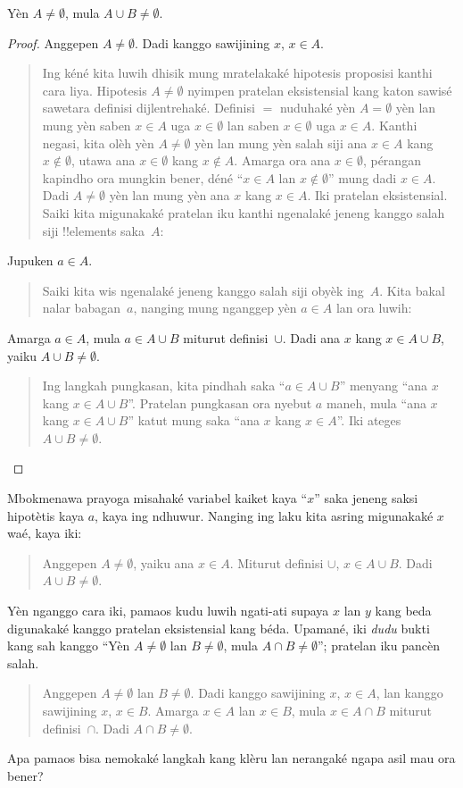 \documentclass[../../../include/open-logic-section]{subfiles}
\begin{document}
\begin{prop}
Yèn $A \neq \emptyset$, mula $A \cup B \neq \emptyset$.
\end{prop}

\begin{proof}
  Anggepen $A \neq \emptyset$. Dadi kanggo sawijining $x$,
  $x \in A$.
  \begin{quote}
    Ing kéné kita luwih dhisik mung mratelakaké hipotesis
    proposisi kanthi cara liya. Hipotesis $A \neq \emptyset$
    nyimpen pratelan eksistensial kang katon sawisé sawetara
    definisi dijlentrehaké. Definisi $=$ nuduhaké yèn
    $A = \emptyset$ yèn lan mung yèn saben $x \in A$
    uga $x \in \emptyset$ lan saben $x \in \emptyset$
    uga $x \in A$. Kanthi negasi, kita olèh yèn $A \neq
    \emptyset$ yèn lan mung yèn salah siji ana $x \in A$ kang
    $x \notin \emptyset$, utawa ana $x \in \emptyset$
    kang $x \notin A$. Amarga ora ana $x \in \emptyset$,
    pérangan kapindho ora mungkin bener, déné ``$x \in A$
    lan $x \notin \emptyset$'' mung dadi $x \in A$.
    Dadi $A \neq \emptyset$ yèn lan mung yèn ana $x$
    kang $x \in A$. Iki pratelan eksistensial. Saiki
    kita migunakaké pratelan iku kanthi ngenalaké jeneng
    kanggo salah siji !!{element}s saka~$A$:
  \end{quote}
  Jupuken $a \in A$.
  \begin{quote}
    Saiki kita wis ngenalaké jeneng kanggo salah siji
    obyèk ing~$A$. Kita bakal nalar babagan~$a$, nanging
    mung nganggep yèn $a \in A$ lan ora luwih:
  \end{quote}
  Amarga $a \in A$, mula $a \in A \cup B$ miturut
  definisi~$\cup$. Dadi ana $x$ kang $x \in A \cup B$,
  yaiku $A \cup B \neq \emptyset$.
  \begin{quote}
    Ing langkah pungkasan, kita pindhah saka ``$a \in A \cup B$''
    menyang ``ana $x$ kang $x \in A \cup B$''.
    Pratelan pungkasan ora nyebut $a$ maneh, mula
    ``ana $x$ kang $x \in A \cup B$'' katut mung saka
    ``ana $x$ kang $x \in A$''. Iki ateges $A \cup B \neq
    \emptyset$.
  \end{quote}
\end{proof}

Mbokmenawa prayoga misahaké variabel kaiket kaya ``$x$''
saka jeneng saksi hipotètis kaya $a$, kaya ing ndhuwur.
Nanging ing laku kita asring migunakaké $x$ waé, kaya iki:
\begin{quote}
Anggepen $A \neq \emptyset$, yaiku ana $x \in A$.
Miturut definisi $\cup$, $x \in A \cup B$.
Dadi $A \cup B \neq \emptyset$.
\end{quote}
Yèn nganggo cara iki, pamaos kudu luwih ngati-ati
supaya $x$ lan $y$ kang beda digunakaké kanggo pratelan
eksistensial kang béda. Upamané, iki \emph{dudu} bukti
kang sah kanggo ``Yèn $A \neq \emptyset$ lan $B \neq
\emptyset$, mula $A \cap B \neq \emptyset$''; pratelan
iku pancèn salah.
\begin{quote}
Anggepen $A \neq \emptyset$ lan $B \neq \emptyset$.
Dadi kanggo sawijining $x$, $x \in A$, lan kanggo
sawijining $x$, $x \in B$. Amarga $x \in A$ lan $x \in
B$, mula $x \in A \cap B$ miturut definisi~$\cap$.
Dadi $A \cap B \neq \emptyset$.
\end{quote}
Apa pamaos bisa nemokaké langkah kang klèru lan nerangaké
ngapa asil mau ora bener?
\end{document}
